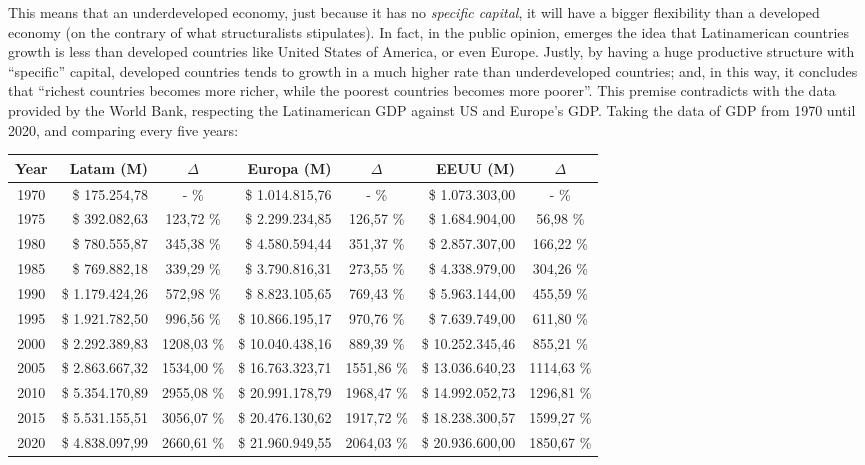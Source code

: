 \documentclass[12pt,a4paper,twoside]{book}
\begin{document}
This means that an underdeveloped economy, just because it has no \textit{specific capital}, it will have a bigger flexibility than a developed economy (on the contrary of what structuralists stipulates). In fact, in the public opinion, emerges the idea that Latinamerican countries growth is less than developed countries like United States of America, or even Europe.  Justly, by having a huge productive structure with “specific” capital, developed countries tends to growth in a much higher rate than underdeveloped countries; and, in this way, it concludes that “richest countries becomes more richer, while the poorest countries becomes more poorer”. This premise contradicts with the data provided by the World Bank, respecting the Latinamerican GDP against US and Europe's GDP. Taking the data of GDP from 1970 until 2020, and comparing every five years:

\begin{center}
\begin{scriptsize}
\begin{longtable}{|c|r|c|r|c|r|c|}
\hline
\textbf{Year} & \textbf{Latam (M)} & \textbf{$ \Delta $} & \textbf{Europa (M)} & \textbf{$ \Delta $} & \textbf{EEUU (M)} & \textbf{$ \Delta $} \\ \hline
1970 & \$ 175.254,78 & - \% & \$ 1.014.815,76 & - \% & \$ 1.073.303,00 & - \% \\ \hline
1975 & \$ 392.082,63 & 123,72 \% & \$ 2.299.234,85 & 126,57 \% & \$ 1.684.904,00 & 56,98 \% \\ \hline
1980 & \$ 780.555,87 & 345,38 \% & \$ 4.580.594,44 & 351,37 \% & \$ 2.857.307,00 & 166,22 \% \\ \hline
1985 & \$ 769.882,18 & 339,29 \% & \$ 3.790.816,31 & 273,55 \% & \$ 4.338.979,00 & 304,26 \% \\ \hline
1990 & \$ 1.179.424,26 & 572,98 \% & \$ 8.823.105,65 & 769,43 \% & \$ 5.963.144,00 & 455,59 \% \\ \hline
1995 & \$ 1.921.782,50 & 996,56 \% & \$ 10.866.195,17 & 970,76 \% & \$ 7.639.749,00 & 611,80 \% \\ \hline
2000 & \$ 2.292.389,83 & 1208,03 \% & \$ 10.040.438,16 & 889,39 \% & \$ 10.252.345,46 & 855,21 \% \\ \hline
2005 & \$ 2.863.667,32 & 1534,00 \% & \$ 16.763.323,71 & 1551,86 \% & \$ 13.036.640,23 & 1114,63 \% \\ \hline
2010 & \$ 5.354.170,89 & 2955,08 \% & \$ 20.991.178,79 & 1968,47 \% & \$ 14.992.052,73 & 1296,81 \% \\ \hline
2015 & \$ 5.531.155,51 & 3056,07 \% & \$ 20.476.130,62 & 1917,72 \% & \$ 18.238.300,57 & 1599,27 \% \\ \hline
2020 & \$ 4.838.097,99 & 2660,61 \% & \$ 21.960.949,55 & 2064,03 \% & \$ 20.936.600,00 & 1850,67 \% \\ \hline
\end{longtable}
\end{scriptsize}
\end{center}




\end{document}
